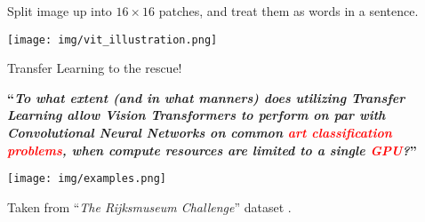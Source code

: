\begin{frame}

Split image up into $16 \times 16$ patches, and treat them as words in a sentence.
\vspace{0.5cm}

\texttt{[image: img/vit\_illustration.png]}

\pause
\vspace{0.5cm}
Transfer Learning to the rescue!

\end{frame}

\newcommand{\stilltoexplain}[1]{\textcolor{red}{#1}}
\begin{frame}
\begin{center}
\textbf{\large ``\textit{To what extent (and in what manners) does utilizing Transfer Learning allow Vision Transformers to perform on par with Convolutional Neural Networks \pause on common \stilltoexplain{art classification problems}, when compute resources are limited to a single \stilltoexplain{GPU}?}''}
\end{center}
\end{frame}

\begin{frame}
\texttt{[image: img/examples.png]}

\vspace{0.5cm}
\centering
Taken from ``\textit{The Rijksmuseum Challenge}'' dataset .
\end{frame}

